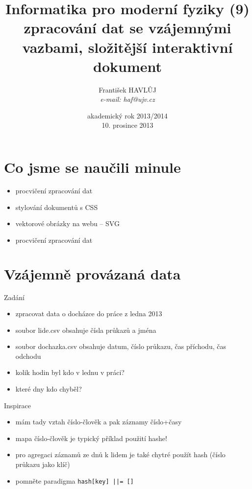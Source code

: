 \documentclass{beamer}
\title[IMF (8)]{Informatika pro moderní fyziky (9)\\ zpracování dat se vzájemnými vazbami, složitější interaktivní dokument}
\author[Franti\v{s}ek HAVL\r{U}J, ORF ÚJV Řež]{Franti\v{s}ek HAVL\r{U}J\\{\scriptsize \emph{e-mail: haf@ujv.cz}}}
\date{akademický rok 2013/2014\\10. prosince 2013}
\institute[ORF ÚJV Řež]
{ÚJV Řež\\oddělení Reaktorové fyziky a podpory palivového cyklu}
\begin{document}
\begin{frame}
  \titlepage
\end{frame}

\begin{frame}
  \tableofcontents
\end{frame}

\section{Co jsme se naučili minule}

\begin{frame}{}
  \begin{itemize}
    \item procvičení zpracování dat
    \item stylování dokumentů s CSS
    \item vektorové obrázky na webu -- SVG
    \item procvičení zpracování dat
  \end{itemize}
\end{frame}

\section{Vzájemně provázaná data}

\begin{frame}{Zadání}
  \begin{itemize}
    \item zpracovat data o docházce do práce z ledna 2013
    \item soubor lide.csv obsahuje čísla průkazů a jména
    \item soubor dochazka.csv obsahuje datum, číslo průkazu, čas příchodu, čas odchodu
    \item kolik hodin byl kdo v lednu v práci?
    \item které dny kdo chyběl?
  \end{itemize}
\end{frame}

\begin{frame}{Inspirace}
  \begin{itemize}
    \item mám tady vztah číslo-člověk a pak záznamy číslo+časy
    \item mapa číslo-člověk je typický příklad použití hashe!
    \item pro agregaci záznamů ze dnů k lidem je také chytré použít hash (číslo průkazu jako klíč)
    \item pomněte paradigma \texttt{hash[key] ||= []}
  \end{itemize}
\end{frame}
\end{document}
